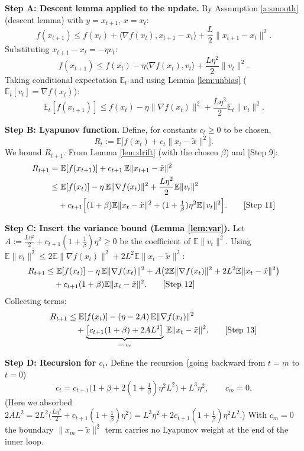 \documentclass[11pt]{article}
\begin{document}
\textbf{Step A: Descent lemma applied to the update.}
By Assumption \ref{a:smooth} (descent lemma) with $y=x_{t+1}$, $x=x_t$:
\[
f(x_{t+1}) \le f(x_t) + \langle \nabla f(x_t), x_{t+1}-x_t\rangle + \frac{L}{2}\|x_{t+1}-x_t\|^2.
\tag*{[Step 7]}
\]
Substituting $x_{t+1}-x_t = -\eta v_t$:
\[
f(x_{t+1}) \le f(x_t) - \eta\langle \nabla f(x_t), v_t\rangle + \frac{L\eta^2}{2}\|v_t\|^2.
\tag*{[Step 8]}
\]
Taking conditional expectation $\mathbb{E}_t$ and using Lemma \ref{lem:unbias}
($\mathbb{E}_t[v_t]=\nabla f(x_t)$):
\[
\mathbb{E}_t[f(x_{t+1})] \le f(x_t) - \eta\|\nabla f(x_t)\|^2 + \frac{L\eta^2}{2}\mathbb{E}_t\|v_t\|^2.
\tag*{[Step 9]}
\]

\textbf{Step B: Lyapunov function.}
Define, for constants $c_t \ge 0$ to be chosen,
\[
R_t := \mathbb{E}\big[ f(x_t) + c_t \|x_t - \tilde{x}\|^2 \big].
\tag*{[Step 10]}
\]
We bound $R_{t+1}$. From Lemma \ref{lem:drift} (with the chosen $\beta$) and [Step 9]:
\begin{align}
R_{t+1} &= \mathbb{E}[f(x_{t+1})] + c_{t+1}\,\mathbb{E}\|x_{t+1}-\tilde{x}\|^2 \notag\\
&\le \mathbb{E}[f(x_t)] - \eta\,\mathbb{E}\|\nabla f(x_t)\|^2 + \frac{L\eta^2}{2}\mathbb{E}\|v_t\|^2 \notag\\
&\quad + c_{t+1}\Big[(1+\beta)\mathbb{E}\|x_t-\tilde{x}\|^2 + (1+\tfrac1\beta)\eta^2\mathbb{E}\|v_t\|^2\Big].
\tag*{[Step 11]}
\end{align}

\textbf{Step C: Insert the variance bound (Lemma \ref{lem:var}).}
Let $A:=\frac{L\eta^2}{2} + c_{t+1}(1+\tfrac1\beta)\eta^2 \ge 0$ be the coefficient of
$\mathbb{E}\|v_t\|^2$. Using
$\mathbb{E}\|v_t\|^2 \le 2\mathbb{E}\|\nabla f(x_t)\|^2 + 2L^2 \mathbb{E}\|x_t-\tilde{x}\|^2$:
\begin{align}
R_{t+1} &\le \mathbb{E}[f(x_t)] - \eta\,\mathbb{E}\|\nabla f(x_t)\|^2
+ A\big(2\mathbb{E}\|\nabla f(x_t)\|^2 + 2L^2\mathbb{E}\|x_t-\tilde{x}\|^2\big)\notag\\
&\quad + c_{t+1}(1+\beta)\mathbb{E}\|x_t-\tilde{x}\|^2.
\tag*{[Step 12]}
\end{align}
Collecting terms:
\begin{align}
R_{t+1} &\le \mathbb{E}[f(x_t)] - (\eta - 2A)\,\mathbb{E}\|\nabla f(x_t)\|^2 \notag\\
&\quad + \underbrace{\big[c_{t+1}(1+\beta) + 2A L^2\big]}_{=:\,c_t}\,\mathbb{E}\|x_t-\tilde{x}\|^2.
\tag*{[Step 13]}
\end{align}

\textbf{Step D: Recursion for $c_t$.}
Define the recursion (going backward from $t=m$ to $t=0$)
\[
c_t = c_{t+1}\Big(1+\beta + 2(1+\tfrac1\beta)\eta^2 L^2\Big) + L^3\eta^2,
\qquad c_m = 0.
\tag*{[Step 14]}
\]
(Here we absorbed $2A L^2 = 2L^2\big(\frac{L\eta^2}{2}+c_{t+1}(1+\frac1\beta)\eta^2\big)
= L^3\eta^2 + 2c_{t+1}(1+\frac1\beta)\eta^2 L^2$.) With $c_m=0$ the boundary
$\|x_m-\tilde{x}\|^2$ term carries no Lyapunov weight at the end of the inner loop.
\end{document}
